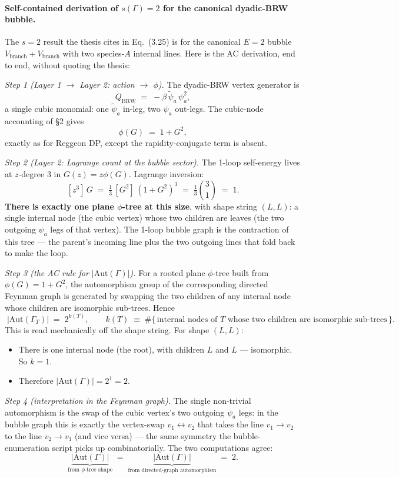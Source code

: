 \documentclass[11pt,a4paper]{article}
\begin{document}
\paragraph{Self-contained derivation of $s(\Gamma)=2$ for the canonical dyadic-BRW bubble.}
The $s=2$ result the thesis cites in Eq.~(3.25) is for the canonical $E=2$
bubble $V_{\text{branch}}+V_{\text{branch}}$ with two species-$A$ internal
lines. Here is the AC derivation, end to end, without quoting the thesis:

\medskip
\noindent\textit{Step 1 (Layer 1 $\to$ Layer 2: action $\to$ $\phi$).}
The dyadic-BRW vertex generator is
\[
Q_{\text{BRW}} \;=\; -\beta\,\tilde\psi_a\,\psi_a^2,
\]
a single cubic monomial: one $\tilde\psi_a$ in-leg, two $\psi_a$ out-legs.
The cubic-node accounting of \S2 gives
\[
\phi(G) \;=\; 1 + G^2,
\]
exactly as for Reggeon DP, except the rapidity-conjugate term is absent.

\medskip
\noindent\textit{Step 2 (Layer 2: Lagrange count at the bubble sector).}
The 1-loop self-energy lives at $z$-degree $3$ in $G(z)=z\phi(G)$. Lagrange
inversion:
\[
[z^3]\,G \;=\; \tfrac{1}{3}\,[G^2]\,(1+G^2)^3 \;=\; \tfrac{1}{3}\binom{3}{1} \;=\; 1.
\]
\textbf{There is exactly one plane $\phi$-tree at this size}, with shape string
$(L,L)$: a single internal node (the cubic vertex) whose two children are leaves
(the two outgoing $\psi_a$ legs of that vertex). The 1-loop bubble graph is the
contraction of this tree --- the parent's incoming line plus the two outgoing
lines that fold back to make the loop.

\medskip
\noindent\textit{Step 3 (the AC rule for $|\mathrm{Aut}(\Gamma)|$).}
For a rooted plane $\phi$-tree built from $\phi(G)=1+G^2$, the automorphism
group of the corresponding directed Feynman graph is generated by swapping
the two children of any internal node whose children are isomorphic
sub-trees. Hence
\[
\boxed{\;
|\mathrm{Aut}(\Gamma_T)| \;=\; 2^{k(T)},
\qquad
k(T) \;\equiv\; \#\bigl\{\,\text{internal nodes of $T$ whose two children are isomorphic sub-trees}\,\bigr\}.
\;}
\]
This is read mechanically off the shape string. For shape $(L,L)$:
\begin{itemize}[leftmargin=2em,itemsep=0pt,topsep=2pt]
  \item There is one internal node (the root), with children $L$ and $L$ --- isomorphic. So $k = 1$.
  \item Therefore $|\mathrm{Aut}(\Gamma)| = 2^1 = 2$.
\end{itemize}

\medskip
\noindent\textit{Step 4 (interpretation in the Feynman graph).}
The single non-trivial automorphism is the swap of the cubic vertex's two
outgoing $\psi_a$ legs: in the bubble graph this is exactly the vertex-swap
$v_1 \leftrightarrow v_2$ that takes the line $v_1\!\to\!v_2$ to the line
$v_2\!\to\!v_1$ (and vice versa) --- the same symmetry the bubble-enumeration
script picks up combinatorially. The two computations agree:
\[
\underbrace{|\mathrm{Aut}(\Gamma)|}_{\text{from }\phi\text{-tree shape}}
\;=\;
\underbrace{|\mathrm{Aut}(\Gamma)|}_{\text{from directed-graph automorphism}}
\;=\; 2.
\]
\end{document}
